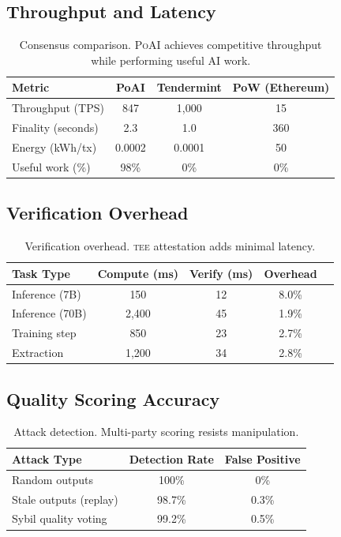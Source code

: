 \documentclass[11pt,letterpaper]{article}
\newcommand{\PoAI}{\textsc{PoAI}}
\newcommand{\TEE}{\textsc{tee}}
\begin{document}
\subsection{Throughput and Latency}

\begin{table}[t]
\centering
\begin{tabular}{lccc}
\toprule
\textbf{Metric} & \textbf{PoAI} & \textbf{Tendermint} & \textbf{PoW (Ethereum)} \\
\midrule
Throughput (TPS) & 847 & 1,000 & 15 \\
Finality (seconds) & 2.3 & 1.0 & 360 \\
Energy (kWh/tx) & 0.0002 & 0.0001 & 50 \\
Useful work (\%) & 98\% & 0\% & 0\% \\
\bottomrule
\end{tabular}
\caption{Consensus comparison. \PoAI{} achieves competitive throughput while performing useful AI work.}
\label{tab:consensus}
\end{table}

\subsection{Verification Overhead}

\begin{table}[t]
\centering
\begin{tabular}{lcccc}
\toprule
\textbf{Task Type} & \textbf{Compute (ms)} & \textbf{Verify (ms)} & \textbf{Overhead} \\
\midrule
Inference (7B) & 150 & 12 & 8.0\% \\
Inference (70B) & 2,400 & 45 & 1.9\% \\
Training step & 850 & 23 & 2.7\% \\
Extraction & 1,200 & 34 & 2.8\% \\
\bottomrule
\end{tabular}
\caption{Verification overhead. \TEE{} attestation adds minimal latency.}
\label{tab:overhead}
\end{table}

\subsection{Quality Scoring Accuracy}

\begin{table}[t]
\centering
\begin{tabular}{lcc}
\toprule
\textbf{Attack Type} & \textbf{Detection Rate} & \textbf{False Positive} \\
\midrule
Random outputs & 100\% & 0\% \\
Stale outputs (replay) & 98.7\% & 0.3\% \\
Sybil quality voting & 99.2\% & 0.5\% \\
\bottomrule
\end{tabular}
\caption{Attack detection. Multi-party scoring resists manipulation.}
\label{tab:attacks}
\end{table}
\end{document}
